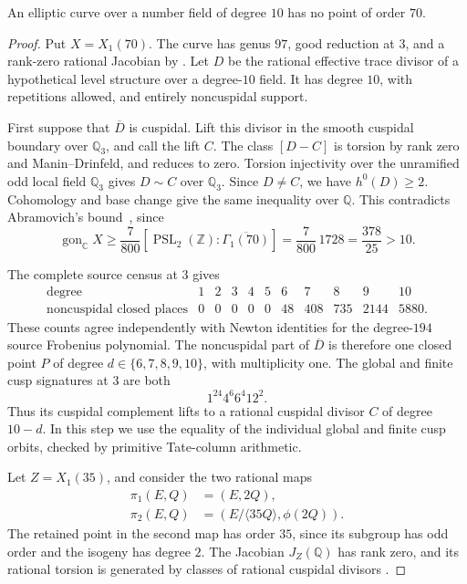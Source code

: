 \begin{proposition}\label{prop:decic-no70}
An elliptic curve over a number field of degree $10$ has no point of
order $70$.
\end{proposition}
\begin{proof}
Put $X=X_1(70)$. The curve has genus $97$, good reduction at $3$,
and a rank-zero rational Jacobian by
\cite[Theorem~3.1(2)]{DEHMZ}. Let $D$ be the rational effective trace
divisor of a hypothetical level structure over a degree-$10$ field.
It has degree $10$, with repetitions allowed, and entirely
noncuspidal support.

First suppose that $\overline D$ is cuspidal. Lift this divisor in
the smooth cuspidal boundary over $\mathbb Q_3$, and call the lift
$C$. The class $[D-C]$ is torsion by rank zero and Manin--Drinfeld,
and reduces to zero. Torsion injectivity over the unramified odd
local field $\mathbb Q_3$ gives $D\sim C$ over $\mathbb Q_3$.
Since $D\ne C$, we have $h^0(D)\geq2$. Cohomology and base change
give the same inequality over $\mathbb Q$. This contradicts
Abramovich's bound~\cite{Abramovich}, since
\[
 \operatorname{gon}_{\mathbb C}X
 \geq\frac7{800}[\operatorname{PSL}_2(\mathbb Z):\overline{\Gamma_1(70)}]
 =\frac7{800}\,1728=\frac{378}{25}>10.
\]

The complete source census at $3$ gives
\[
\begin{array}{c|rrrrrrrrrr}
 \text{degree}&1&2&3&4&5&6&7&8&9&10\\ \hline
 \text{noncuspidal closed places}&0&0&0&0&0&48&408&735&2144&5880.
\end{array}
\]
These counts agree independently with Newton identities for the
degree-$194$ source Frobenius polynomial. The noncuspidal part of
$\overline D$ is therefore one closed point $P$ of degree
$d\in\{6,7,8,9,10\}$, with multiplicity one. The global and finite
cusp signatures at $3$ are both
\[
                         1^{24}4^6 6^4 12^2.
\]
Thus its cuspidal complement lifts to a rational cuspidal divisor
$C$ of degree $10-d$. In this step we use the equality of the
individual global and finite cusp orbits, checked by primitive
Tate-column arithmetic.

Let $Z=X_1(35)$, and consider the two rational maps
\[
 \begin{split}
 \pi_1(E,Q)&=(E,2Q),\\
 \pi_2(E,Q)&=(E/\langle35Q\rangle,\phi(2Q)).
 \end{split}
\]
The retained point in the second map has order $35$, since its
subgroup has odd order and the isogeny has degree $2$.
The Jacobian $J_Z(\mathbb Q)$ has rank zero, and its rational
torsion is generated by classes of rational cuspidal divisors
\cite[Theorems~3.1(2), 4.13 and Table~2]{DEHMZ}.


\end{proof}
